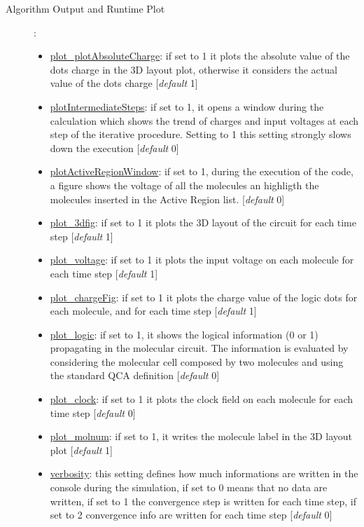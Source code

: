 \documentclass[a4paper,10pt]{article}
\begin{document}
\begin{description}
\item[Algorithm Output and Runtime Plot]:
	\begin{itemize}
	\item \underline{plot\_plotAbsoluteCharge}: if set to 1 it plots the absolute value of the dots charge in the 3D layout plot, otherwise it considers the actual value of the dots charge [\textit{default} 1] 
	\item \underline{plotIntermediateSteps}: if set to 1, it opens a window during the calculation which shows the trend of charges and input voltages at each step of the iterative procedure. Setting to 1 this setting strongly slows down the execution [\textit{default} 0] 
	\item \underline{plotActiveRegionWindow}: if set to 1, during the execution of the code, a figure shows the voltage of all the molecules an highligth the molecules inserted in the Active Region list.  [\textit{default} 0] 
	\item \underline{plot\_3dfig}: if set to 1 it plots the 3D layout of the circuit for each time step [\textit{default} 1] 
	\item \underline{plot\_voltage}: if set to 1 it plots the input voltage on each molecule for each time step [\textit{default} 1] 
	\item \underline{plot\_chargeFig}: if set to 1 it plots the charge value of the logic dots for each molecule, and for each time step [\textit{default} 1] 
	\item \underline{plot\_logic}: if set to 1, it shows the logical information (0 or 1) propagating in the molecular circuit. The information is evaluated by considering the molecular cell composed by two molecules and using the standard QCA definition  [\textit{default} 0]
	\item \underline{plot\_clock}: if set to 1 it plots the clock field on each molecule for each time step [\textit{default} 0]
	\item \underline{plot\_molnum}: if set to 1, it writes the molecule label in the 3D layout plot [\textit{default} 1] 
	\item \underline{verbosity}: this setting defines how much informations are written in the console during the simulation, if set to 0 means that no data are written, if set to 1 the convergence step is written for each time step, if set to 2 convergence info are written for each time step [\textit{default} 0] 

\end{itemize}
\end{description}
\end{document}
